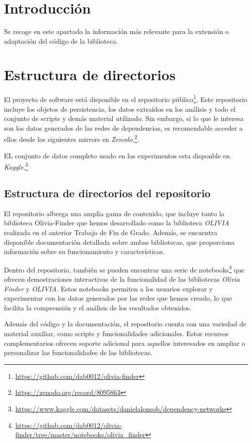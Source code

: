 
\section{Introducción}
Se recoge en este apartado la información más relevante para la extensión
o adaptación del código de la biblioteca.

\section{Estructura de directorios}
El proyecto de software está disponible en el repositorio público\footnote{\url{https://github.com/dab0012/olivia-finder}}.
Este repositorio incluye los objetos de persistencia, los datos extraídos en los análisis y todo el
conjunto de scripts y demás material utilizado. Sin embargo, si lo que le interesa son los datos generados de las redes de dependencias,
es recomendable acceder a ellos desde los siguientes mirrors en \textit{Zenodo}.\footnote{\url{https://zenodo.org/record/8095863}}.

EL conjunto de datos completo usado en los experimentos esta disponble en \textit{Kaggle}.\footnote{\url{https://www.kaggle.com/datasets/danielalonsob/dependency-networks}}

\subsection{Estructura de directorios del repositorio}

El repositorio alberga una amplia gama de contenido, que incluye tanto la biblioteca Olivia-Finder que hemos
desarrollado como la biblioteca \textit{OLIVIA} realizada en el anterior Trabajo de Fin de Grado\cite{Seto-Rey20231}. Además, se encuentra
disponible documentación detallada sobre ambas bibliotecas, que proporciona información sobre su
funcionamiento y características.

Dentro del repositorio, también se pueden encontrar una serie de notebooks\footnote{\url{https://github.com/dab0012/olivia-finder/tree/master/notebooks/olivia\_finder}} 
que ofrecen demostraciones interactivas de la funcionalidad de las bibliotecas \textit{Olivia Finder} y \textit{OLIVIA}. 
Estos notebooks permiten a los usuarios explorar y experimentar con los datos generados por las redes que 
hemos creado, lo que facilita la comprensión y el análisis de los resultados obtenidos.

Además del código y la documentación, el repositorio cuenta con una variedad de material auxiliar, como scripts
y funcionalidades adicionales. Estos recursos complementarios ofrecen soporte adicional para aquellos interesados
en ampliar o personalizar las funcionalidades de las bibliotecas.

